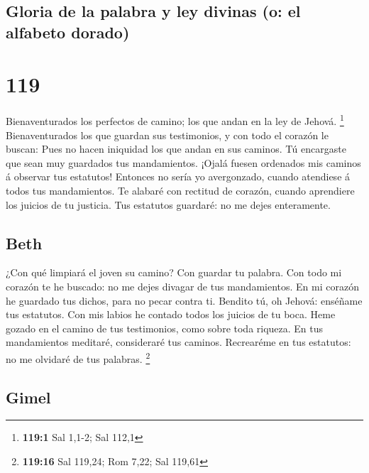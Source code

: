 \hypertarget{gloria-de-la-palabra-y-ley-divinas-o-el-alfabeto-dorado}{%
\subsection{Gloria de la palabra y ley divinas (o: el alfabeto
dorado)}\label{gloria-de-la-palabra-y-ley-divinas-o-el-alfabeto-dorado}}

\hypertarget{section-118}{%
\section{119}\label{section-118}}

 Bienaventurados los perfectos de camino; los que andan en
la ley de Jehová. \footnote{\textbf{119:1} Sal 1,1-2; Sal 112,1}
 Bienaventurados los que guardan sus testimonios, y con todo
el corazón le buscan:  Pues no hacen iniquidad los que andan
en sus caminos.  Tú encargaste que sean muy guardados tus
mandamientos.  ¡Ojalá fuesen ordenados mis caminos á
observar tus estatutos!  Entonces no sería yo avergonzado,
cuando atendiese á todos tus mandamientos.  Te alabaré con
rectitud de corazón, cuando aprendiere los juicios de tu justicia.
 Tus estatutos guardaré: no me dejes enteramente.

\hypertarget{beth}{%
\subsection{Beth}\label{beth}}

 ¿Con qué limpiará el joven su camino? Con guardar tu
palabra.  Con todo mi corazón te he buscado: no me dejes
divagar de tus mandamientos.  En mi corazón he guardado tus
dichos, para no pecar contra ti.  Bendito tú, oh Jehová:
enséñame tus estatutos.  Con mis labios he contado todos
los juicios de tu boca.  Heme gozado en el camino de tus
testimonios, como sobre toda riqueza.  En tus mandamientos
meditaré, consideraré tus caminos.  Recrearéme en tus
estatutos: no me olvidaré de tus palabras. \footnote{\textbf{119:16} Sal
  119,24; Rom 7,22; Sal 119,61}

\hypertarget{gimel}{%
\subsection{Gimel}\label{gimel}}

